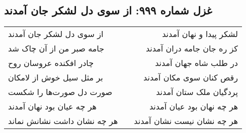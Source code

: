 \begin{center}
\section*{غزل شماره ۹۹۹: از سوی دل لشکر جان آمدند}
\label{sec:0999}
\begin{longtable}{l p{0.5cm} r}
از سوی دل لشکر جان آمدند
&&
لشکر پیدا و نهان آمدند
\\
جامه صبر من از آن چاک شد
&&
کز ره جان جامه دران آمدند
\\
چادر افکنده عروسان روح
&&
در طلب شاه جهان آمدند
\\
بر مثل سیل خوش از لامکان
&&
رقص کنان سوی مکان آمدند
\\
صورت دل صورت‌ها را شکست
&&
پردگیان ملک ستان آمدند
\\
هر چه عیان بود نهان آمدند
&&
هر چه نهان بود عیان آمدند
\\
هر چه نشان داشت نشانش نماند
&&
هر چه نشان نیست نشان آمدند
\\
\end{longtable}
\end{center}

